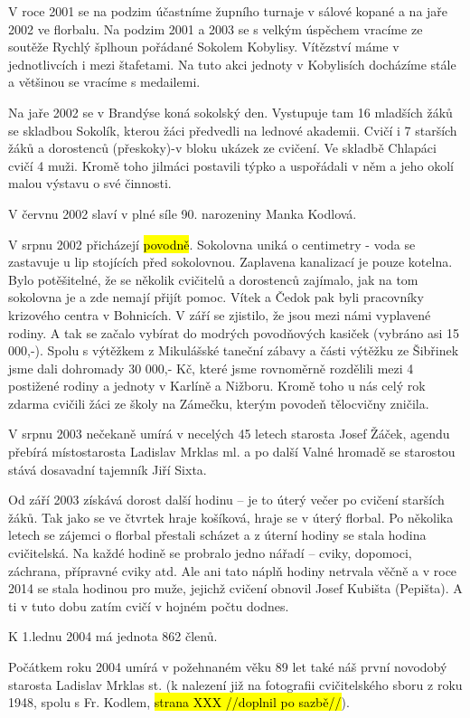 V roce 2001 se na podzim účastníme župního turnaje v sálové kopané a na
jaře 2002 ve florbalu. Na podzim 2001 a 2003 se s velkým úspěchem
vracíme ze soutěže Rychlý šplhoun pořádané Sokolem Kobylisy. Vítězství
máme v jednotlivcích i mezi štafetami. Na tuto akci jednoty v Kobylisích
docházíme stále a většinou se vracíme s medailemi.

Na jaře 2002 se v Brandýse koná sokolský den. Vystupuje tam 16 mladších
žáků se skladbou Sokolík, kterou žáci předvedli na lednové akademii.
Cvičí i 7 starších žáků a dorostenců (přeskoky)-v bloku ukázek ze
cvičení. Ve skladbě Chlapáci cvičí 4 muži. Kromě toho jilmáci postavili
týpko a uspořádali v něm a jeho okolí malou výstavu o své činnosti.

V červnu 2002 slaví v plné síle 90. narozeniny Manka Kodlová.

V srpnu 2002 přicházejí \hl{povodně}. Sokolovna uniká o centimetry -
voda se zastavuje u lip stojících před sokolovnou. Zaplavena kanalizací
je pouze kotelna. Bylo potěšitelné, že se několik cvičitelů a dorostenců
zajímalo, jak na tom sokolovna je a zde nemají přijít pomoc. Vítek a
Čedok pak byli pracovníky krizového centra v Bohnicích. V září se
zjistilo, že jsou mezi námi vyplavené rodiny. A tak se začalo vybírat do
modrých povodňových kasiček (vybráno asi 15 000,-). Spolu s výtěžkem z
Mikulášské taneční zábavy a části výtěžku ze Šibřinek jsme dali
dohromady 30 000,- Kč, které jsme rovnoměrně rozdělili mezi 4 postižené
rodiny a jednoty v Karlíně a Nižboru. Kromě toho u nás celý rok zdarma
cvičili žáci ze školy na Zámečku, kterým povodeň tělocvičny zničila.

V srpnu 2003 nečekaně umírá v necelých 45 letech starosta Josef Žáček,
agendu přebírá místostarosta Ladislav Mrklas ml. a po další Valné
hromadě se starostou stává dosavadní tajemník Jiří Sixta.

Od září 2003 získává dorost další hodinu -- je to úterý večer po cvičení
starších žáků. Tak jako se ve čtvrtek hraje košíková, hraje se v úterý
florbal. Po několika letech se zájemci o florbal přestali scházet a z
úterní hodiny se stala hodina cvičitelská. Na každé hodině se probralo
jedno nářadí -- cviky, dopomoci, záchrana, přípravné cviky atd. Ale ani
tato náplň hodiny netrvala věčně a v roce 2014 se stala hodinou pro
muže, jejichž cvičení obnovil Josef Kubišta (Pepišta). A ti v tuto dobu
zatím cvičí v hojném počtu dodnes.

K 1.lednu 2004 má jednota 862 členů.

Počátkem roku 2004 umírá v požehnaném věku 89 let také náš první
novodobý starosta Ladislav Mrklas st. (k nalezení již na fotografii
cvičitelského sboru z roku 1948, spolu s Fr. Kodlem, \hl{strana XXX
//doplnil po sazbě//}).

